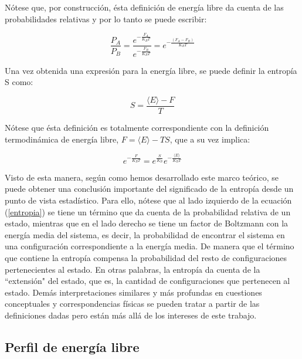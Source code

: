 \documentclass [11pt]{article}
\begin{document}
Nótese que, por construcción, ésta definición de energía libre da cuenta de las probabilidades relativas y por lo tanto se puede escribir:

\begin{equation}
    \frac{P_A}{P_B}=\frac{e^{-\frac{F_A}{K_BT}}}{e^{-\frac{F_B}{K_BT}}}=e^{-\frac{(F_A-F_B)}{K_BT}}
\end{equation}

Una vez obtenida una expresión para la energía libre, se puede definir la entropía S como:

\begin{equation}
    S=\frac{\langle E\rangle-F}{T}
\end{equation}

Nótese que ésta definición es totalmente correspondiente con la definición termodinámica de energía libre, $F=\langle E\rangle-TS$, que a su vez implica:

\begin{equation}\label{entropia}
    e^{-\frac{F}{K_BT}}=e^{\frac{S}{K_B}}e^{-\frac{\langle E\rangle}{K_BT}}
\end{equation}

Visto de esta manera, según como hemos desarrollado este marco teórico, se puede obtener una conclusión importante del significado de la entropía desde un punto de vista estadístico. Para ello, nótese que al lado izquierdo de la ecuación (\ref{entropia}) se tiene un término que da cuenta de la probabilidad relativa de un estado, mientras que en el lado derecho se tiene un factor de Boltzmann con la energía media del sistema, es decir, la probabilidad de encontrar el sistema en una configuración correspondiente a la energía media. De manera que el término que contiene la entropía compensa la probabilidad del resto de configuraciones pertenecientes al estado. En otras palabras, la entropía da cuenta de la ``extensión" del estado, que es, la cantidad de configuraciones que pertenecen al estado. Demás interpretaciones similares y más profundas en cuestiones conceptuales y correspondencias físicas se pueden tratar a partir de las definiciones dadas pero están más allá de los intereses de este trabajo.

\subsection{Perfil de energía libre}
\end{document}
